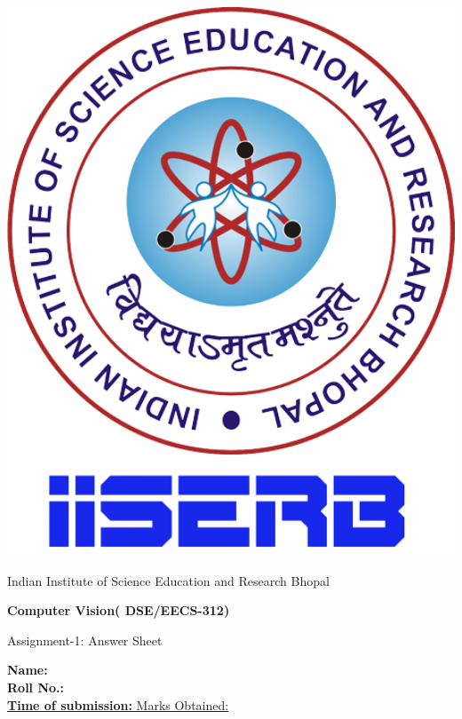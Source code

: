 \documentclass[12pt, a4paper]{exam}
\begin{document}
	\noindent
	\begin{minipage}[l]{0.1\textwidth}
		\noindent
		\includegraphics[width=1.8\textwidth]{IISERB_new_logo_updated_2022.png}
	\end{minipage}
\hfill
\begin{minipage}[c]{0.8\textwidth}
	\begin{center}
		{\large	Indian Institute of Science Education and Research Bhopal \par
		\large	\par
	\large \textbf{	Computer Vision( DSE/EECS-312)}	\par
\small	Assignment-1: Answer Sheet}
	\end{center}
\end{minipage}
\par
\vspace{0.2in}
\noindent
\textbf{Name: }\\
\noindent
\textbf{Roll No.:  }\\
\noindent
\uline{\textbf{Time of submission: } \hfill 		\hfill Marks Obtained: } \\
\end{document}
